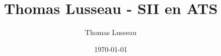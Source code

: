\documentclass[
	fontsize=10pt, %
	twoside=true, %
]{kaobook}
\newcommand{\repRel}{../}
\newcommand{\repStyle}{\repRel/Style}
\begin{document}

\titlehead{Thomas Lusseau - SII en ATS}
\title[Thomas Lusseau - SII en ATS]{Thomas Lusseau - SII en ATS}
\author[TL]{Thomas Lusseau}
\date{\today}


\begingroup %
\endgroup

%
\mainmatter %
%
%
%
%


\setcounter{margintocdepth}{\sectiontocdepth}
\marginlayout
\graphicspath{{\repStyle/png}}

\pagestyle{scrheadings}


\livrettrue %
\collefalse



\end{document}
